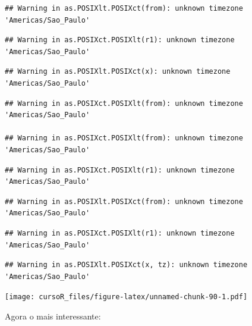 \documentclass[]{book}
\theoremstyle{definition}
\theoremstyle{definition}
\theoremstyle{definition}
\theoremstyle{remark}
\begin{document}
\begin{verbatim}
## Warning in as.POSIXlt.POSIXct(from): unknown timezone 'Americas/Sao_Paulo'
\end{verbatim}

\begin{verbatim}
## Warning in as.POSIXct.POSIXlt(r1): unknown timezone 'Americas/Sao_Paulo'
\end{verbatim}

\begin{verbatim}
## Warning in as.POSIXlt.POSIXct(x): unknown timezone 'Americas/Sao_Paulo'
\end{verbatim}

\begin{verbatim}
## Warning in as.POSIXct.POSIXlt(from): unknown timezone 'Americas/Sao_Paulo'

## Warning in as.POSIXct.POSIXlt(from): unknown timezone 'Americas/Sao_Paulo'
\end{verbatim}

\begin{verbatim}
## Warning in as.POSIXct.POSIXlt(r1): unknown timezone 'Americas/Sao_Paulo'
\end{verbatim}

\begin{verbatim}
## Warning in as.POSIXlt.POSIXct(from): unknown timezone 'Americas/Sao_Paulo'
\end{verbatim}

\begin{verbatim}
## Warning in as.POSIXct.POSIXlt(r1): unknown timezone 'Americas/Sao_Paulo'
\end{verbatim}

\begin{verbatim}
## Warning in as.POSIXlt.POSIXct(x, tz): unknown timezone 'Americas/Sao_Paulo'
\end{verbatim}

\texttt{[image: cursoR\_files/figure-latex/unnamed-chunk-90-1.pdf]}

Agora o mais interessante:
\end{document}
